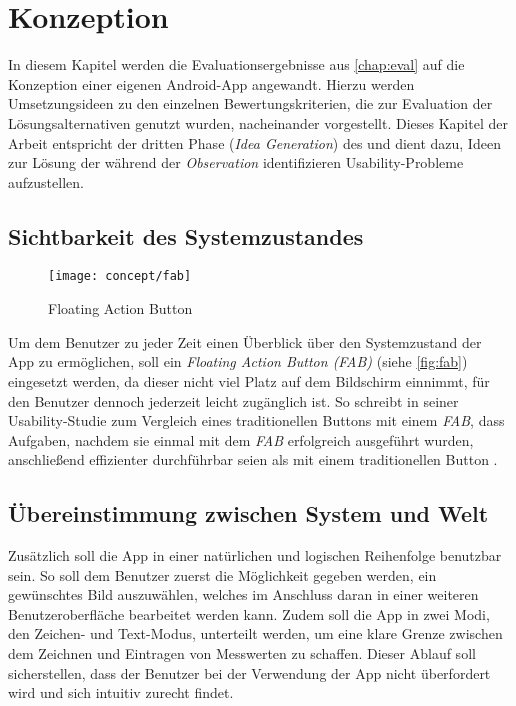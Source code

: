 \chapter{Konzeption}\label{chap:concept}
In diesem Kapitel werden die Evaluationsergebnisse aus \autoref{chap:eval} auf die Konzeption einer eigenen Android-App angewandt.
Hierzu werden Umsetzungsideen zu den einzelnen Bewertungskriterien, die zur Evaluation der Lösungsalternativen genutzt wurden, nacheinander vorgestellt.
Dieses Kapitel der Arbeit entspricht der dritten Phase (\emph{Idea Generation}) des \hcdp{} und dient dazu, Ideen zur Lösung der während der \emph{Observation} identifizieren Usability-Probleme aufzustellen.

\section{Sichtbarkeit des Systemzustandes}
\begin{wrapfigure}{R}{0.4\textwidth}
  \centering
  \texttt{[image: concept/fab]}
  \caption{Floating Action Button}
  \label{fig:fab}
\end{wrapfigure}

Um dem Benutzer zu jeder Zeit einen Überblick über den Systemzustand der App zu ermöglichen, soll ein \emph{Floating Action Button (FAB)} (siehe \autoref{fig:fab}) eingesetzt werden, da dieser nicht viel Platz auf dem Bildschirm einnimmt, für den Benutzer dennoch jederzeit leicht zugänglich ist.
So schreibt \citeauthor{SJ16} in seiner Usability-Studie zum Vergleich eines traditionellen Buttons mit einem \emph{FAB}, dass Aufgaben, nachdem sie einmal mit dem \emph{FAB} erfolgreich ausgeführt wurden, anschließend effizienter durchführbar seien als mit einem traditionellen Button \citep[Seiten 14--16]{SJ16}.

\section{Übereinstimmung zwischen System und Welt}
Zusätzlich soll die App in einer natürlichen und logischen Reihenfolge benutzbar sein.
So soll dem Benutzer zuerst die Möglichkeit gegeben werden, ein gewünschtes Bild auszuwählen, welches im Anschluss daran in einer weiteren Benutzeroberfläche bearbeitet werden kann.
Zudem soll die App in zwei Modi, den Zeichen- und Text-Modus, unterteilt werden, um eine klare Grenze zwischen dem Zeichnen und Eintragen von Messwerten zu schaffen.
Dieser Ablauf soll sicherstellen, dass der Benutzer bei der Verwendung der App nicht überfordert wird und sich intuitiv zurecht findet.

